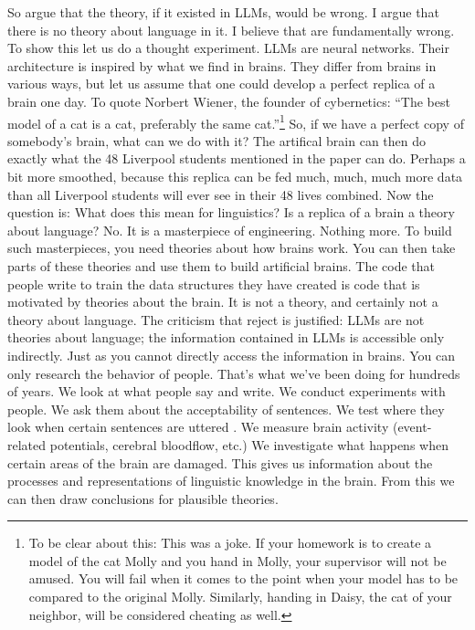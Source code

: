So \citet{FoxKatzir2024a} argue that the theory, if it existed in LLMs, would be wrong. I argue that
there is no theory about language in it. I believe that \citet{AmbridgeBlything2024a} are
fundamentally wrong. To show this let us do a thought experiment. LLMs are neural networks. Their
architecture is inspired by what we find in brains. They differ from brains in various ways, but let
us assume that one could develop a perfect replica of a brain one day. To quote
Norbert Wiener, the founder of cybernetics: ``The best model of a cat is a cat, preferably the same
cat.''\footnote{%
To be clear about this: This was a joke. If your homework is to create a model of the cat Molly and
you hand in Molly, your supervisor will not be amused. You will fail when it comes to the point when
your model has to be compared to the original Molly. Similarly, handing in Daisy, the cat of your
neighbor, will be considered cheating as well.
} So, if we have a perfect copy of somebody's brain, what can we do with it? The artifical brain can then do exactly what
the 48 Liverpool students mentioned in the  paper can do. Perhaps a
bit more smoothed, because this replica can be fed much, much, much more data than all Liverpool
students will ever see in their 48 lives combined. Now the question is: What does this mean for
linguistics? Is a replica of a brain a theory about language? No. It is a masterpiece of
engineering. Nothing more. To build such masterpieces, you need theories about how brains work. You can then take parts of these theories and use them to build
artificial brains. The code that people write to train the data structures they have created is code
that is motivated by theories about the brain. It is not a theory, and certainly not a theory about
language. The criticism that  reject is justified: LLMs are not
theories about language; the information contained in LLMs is accessible only indirectly. Just as
you cannot directly access the information in brains. You can only research the behavior of
people. That's what we've been doing for hundreds of years. We look at what people say and write. We
conduct experiments with people. We ask them about the acceptability of sentences. We test where
they look when certain sentences are uttered \citep{TSKES95a}. We measure brain activity (event-related potentials,
cerebral bloodflow, etc.) We investigate what happens when certain areas of the brain are damaged.
This gives us information about the processes and representations of linguistic knowledge in the
brain. From this we can then draw conclusions for plausible theories.  

